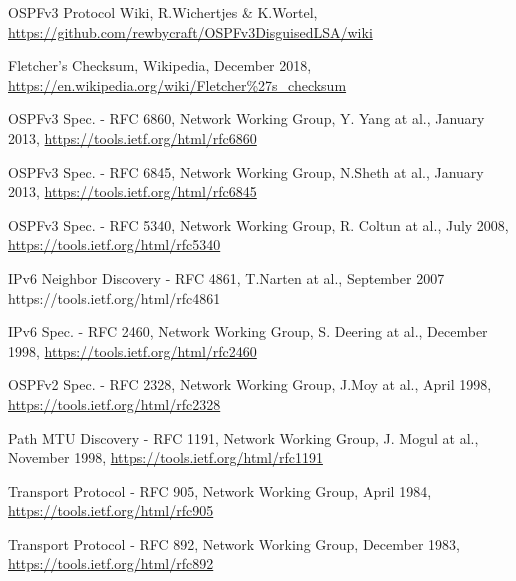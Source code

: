 \documentclass[11pt,a4paper,oneside]{article}
\begin{document}
		
    \begin{thebibliography}{999}

        OSPFv3 Protocol Wiki,
        R.Wichertjes \& K.Wortel,
        \url{https://github.com/rewbycraft/OSPFv3DisguisedLSA/wiki}

        Fletcher's Checksum,
        Wikipedia,
        December 2018,
        \url{https://en.wikipedia.org/wiki/Fletcher\%27s_checksum}


        OSPFv3 Spec. - RFC 6860,
        Network Working Group,
        Y. Yang at al.,
        January 2013,
        \url{https://tools.ietf.org/html/rfc6860}

        OSPFv3 Spec. - RFC 6845,
        Network Working Group,
        N.Sheth at al.,
        January 2013,
        \url{https://tools.ietf.org/html/rfc6845}

        OSPFv3 Spec. - RFC 5340,
        Network Working Group,
        R. Coltun at al.,
        July 2008,
        \url{https://tools.ietf.org/html/rfc5340}
        
        IPv6 Neighbor Discovery - RFC 4861,
        T.Narten at al.,
        September 2007
        https://tools.ietf.org/html/rfc4861

        IPv6 Spec. - RFC 2460,
        Network Working Group,
        S. Deering at al.,
        December 1998,
        \url{https://tools.ietf.org/html/rfc2460}

        OSPFv2 Spec. - RFC 2328,
        Network Working Group,
        J.Moy at al.,
        April 1998,
        \url{https://tools.ietf.org/html/rfc2328}

        Path MTU Discovery - RFC 1191,
        Network Working Group,
        J. Mogul at al.,
        November 1998,
        \url{https://tools.ietf.org/html/rfc1191}

        Transport Protocol - RFC 905,
        Network Working Group,
        April 1984,
        \url{https://tools.ietf.org/html/rfc905}

        Transport Protocol - RFC 892,
        Network Working Group,
        December 1983,
        \url{https://tools.ietf.org/html/rfc892}

    \end{thebibliography}
\end{document}
